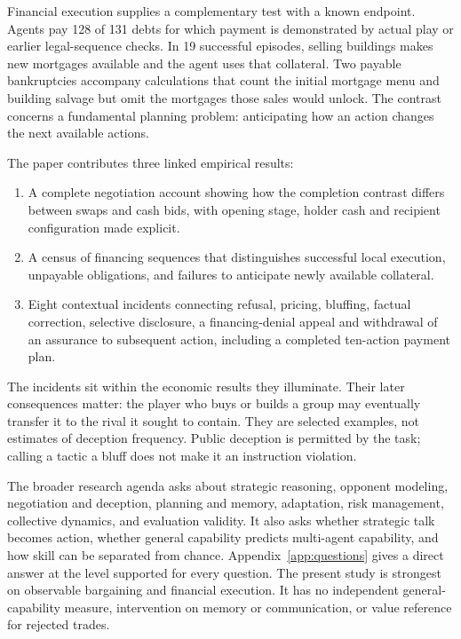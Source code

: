 Financial execution supplies a complementary test with a known endpoint. Agents pay 128 of 131 debts for which payment is demonstrated by actual play or earlier legal-sequence checks. In 19 successful episodes, selling buildings makes new mortgages available and the agent uses that collateral. Two payable bankruptcies accompany calculations that count the initial mortgage menu and building salvage but omit the mortgages those sales would unlock. The contrast concerns a fundamental planning problem: anticipating how an action changes the next available actions.

The paper contributes three linked empirical results:
\begin{enumerate}
\item A complete negotiation account showing how the completion contrast differs between swaps and cash bids, with opening stage, holder cash and recipient configuration made explicit.
\item A census of financing sequences that distinguishes successful local execution, unpayable obligations, and failures to anticipate newly available collateral.
\item Eight contextual incidents connecting refusal, pricing, bluffing, factual correction, selective disclosure, a financing-denial appeal and withdrawal of an assurance to subsequent action, including a completed ten-action payment plan.
\end{enumerate}

The incidents sit within the economic results they illuminate. Their later consequences matter: the player who buys or builds a group may eventually transfer it to the rival it sought to contain. They are selected examples, not estimates of deception frequency. Public deception is permitted by the task; calling a tactic a bluff does not make it an instruction violation.

The broader research agenda asks about strategic reasoning, opponent modeling, negotiation and deception, planning and memory, adaptation, risk management, collective dynamics, and evaluation validity. It also asks whether strategic talk becomes action, whether general capability predicts multi-agent capability, and how skill can be separated from chance. Appendix~\ref{app:questions} gives a direct answer at the level supported for every question. The present study is strongest on observable bargaining and financial execution. It has no independent general-capability measure, intervention on memory or communication, or value reference for rejected trades.
